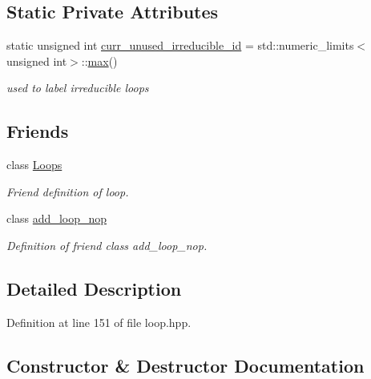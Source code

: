 \subsection*{Static Private Attributes}
\begin{DoxyCompactItemize}
\item 
static unsigned int \hyperlink{classLoop_a7da3779600d056f3ed5e0482e150d334}{curr\+\_\+unused\+\_\+irreducible\+\_\+id} = std\+::numeric\+\_\+limits$<$unsigned int$>$\+::\hyperlink{tutorial__pact__2019_2Target-Customization_2first_2hint_8c_a28f422940797ea297699ba55d89171c5}{max}()
\begin{DoxyCompactList}\small\item\em used to label irreducible loops \end{DoxyCompactList}\end{DoxyCompactItemize}
\subsection*{Friends}
\begin{DoxyCompactItemize}
\item 
class \hyperlink{classLoop_a90dc76c4683e3f7821ce69689196b744}{Loops}
\begin{DoxyCompactList}\small\item\em Friend definition of loop. \end{DoxyCompactList}\item 
class \hyperlink{classLoop_aaa74bc08e8734cd3e20273fb6092781a}{add\+\_\+loop\+\_\+nop}
\begin{DoxyCompactList}\small\item\em Definition of friend class add\+\_\+loop\+\_\+nop. \end{DoxyCompactList}\end{DoxyCompactItemize}


\subsection{Detailed Description}


Definition at line 151 of file loop.\+hpp.



\subsection{Constructor \& Destructor Documentation}
\mbox{\label{classLoop_aad82e65a6d90bb6b7627f5005ddcbe0e}} 
